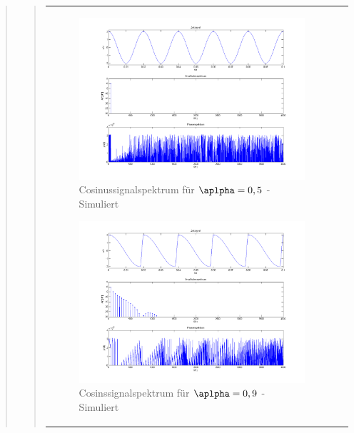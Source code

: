 \begin{quote}
\begin{quote}
\begin{center}
\begin{tabular}{ll}
\begin{minipage}{0.6\textwidth}
                    \begin{figure}[H]
                        \label{fig:}            
                        \includegraphics[scale=0.25]{./Bilder/cos_alpha5.png} %
                        \caption{Cosinussignalspektrum für $\aplpha = 0,5$ - Simuliert}
                    \end{figure}

                    \begin{figure}[H]
                        \label{fig:}            
                        \includegraphics[scale=0.25]{./Bilder/cos_alpha9.png} %
                        \caption{Cosinssignalspektrum für $\aplpha = 0,9$ - Simuliert}
                    \end{figure}


\end{minipage}
\end{tabular}
\end{center}
\end{quote}
\end{quote}
